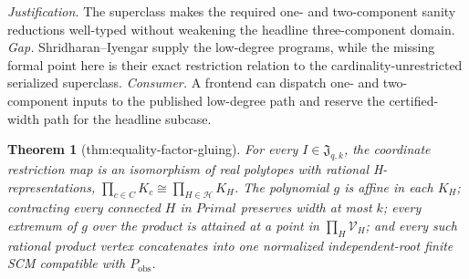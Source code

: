\documentclass{article}
\newtheorem{theorem}{Theorem}
\begin{document}
\par\smallskip\noindent \textit{Justification.} The superclass makes the required one- and two-component sanity reductions well-typed without weakening the headline three-component domain. \textit{Gap.} Shridharan--Iyengar supply the low-degree programs, while the missing formal point here is their exact restriction relation to the cardinality-unrestricted serialized superclass. \textit{Consumer.} A frontend can dispatch one- and two-component inputs to the published low-degree path and reserve the certified-width path for the headline subcase.

\begin{theorem}[thm:equality-factor-gluing]\label{thm:equality-factor-gluing}
For every \(I\in\mathfrak J_{q,k}\), the coordinate restriction map is an isomorphism of real polytopes with rational H-representations, \(\prod_{c\in C}K_c\cong\prod_{H\in\mathcal H}K_H\). The polynomial \(g\) is affine in each \(K_H\); contracting every connected \(H\) in \(Primal\) preserves width at most \(k\); every extremum of \(g\) over the product is attained at a point in \(\prod_H\mathcal V_H\); and every such rational product vertex concatenates into one normalized independent-root finite SCM compatible with \(P_{\mathrm{obs}}\).
\end{theorem}
\end{document}
